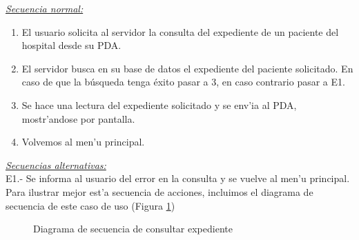\emph{\underline{Secuencia normal:}}
\begin{enumerate}
	\item El usuario solicita al servidor la consulta del expediente de un paciente del hospital desde su PDA.
	\item El servidor busca en su base de datos el expediente del paciente solicitado. En caso de que la b\'usqueda tenga \'exito pasar a 3, en caso contrario pasar a E1.
	\item Se hace una lectura del expediente solicitado y se env'ia al PDA, mostr'andose por pantalla.
	\item Volvemos al men'u principal.
\end{enumerate}

\emph{\underline{Secuencias alternativas:}}\bigskip \\ E1.- Se informa al usuario del error en la consulta y se vuelve al men'u principal.\bigskip \\ Para ilustrar mejor est'a secuencia de acciones, incluimos el diagrama de secuencia de este caso de uso (Figura \ref{fig:consulta_expediente})

\begin{figure}[h!]
	\begin{center}
     	\end{center}
    	\caption{Diagrama de secuencia de consultar expediente}\label{fig:consulta_expediente}
\end{figure}
\pagebreak
\newpage 